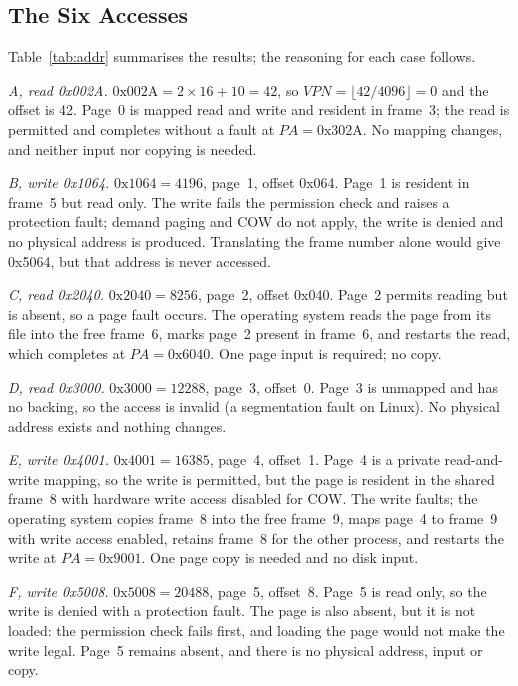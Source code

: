 \documentclass[conference,a4paper]{IEEEtran}
\begin{document}
\subsection{The Six Accesses}
Table~\ref{tab:addr} summarises the results; the reasoning for each case follows.

\emph{A, read 0x002A.} $\mathrm{0x002A} = 2\times16+10 = 42$, so $\mathit{VPN}=\lfloor 42/4096\rfloor = 0$ and the offset is 42. Page~0 is mapped read and write and resident in frame~3; the read is permitted and completes without a fault at $PA = \mathrm{0x302A}$. No mapping changes, and neither input nor copying is needed.

\emph{B, write 0x1064.} $\mathrm{0x1064} = 4196$, page~1, offset 0x064. Page~1 is resident in frame~5 but read only. The write fails the permission check and raises a protection fault; demand paging and COW do not apply, the write is denied and no physical address is produced. Translating the frame number alone would give 0x5064, but that address is never accessed.

\emph{C, read 0x2040.} $\mathrm{0x2040} = 8256$, page~2, offset 0x040. Page~2 permits reading but is absent, so a page fault occurs. The operating system reads the page from its file into the free frame~6, marks page~2 present in frame~6, and restarts the read, which completes at $PA = \mathrm{0x6040}$. One page input is required; no copy.

\emph{D, read 0x3000.} $\mathrm{0x3000} = 12288$, page~3, offset~0. Page~3 is unmapped and has no backing, so the access is invalid (a segmentation fault on Linux). No physical address exists and nothing changes.

\emph{E, write 0x4001.} $\mathrm{0x4001} = 16385$, page~4, offset~1. Page~4 is a private read-and-write mapping, so the write is permitted, but the page is resident in the shared frame~8 with hardware write access disabled for COW. The write faults; the operating system copies frame~8 into the free frame~9, maps page~4 to frame~9 with write access enabled, retains frame~8 for the other process, and restarts the write at $PA = \mathrm{0x9001}$. One page copy is needed and no disk input.

\emph{F, write 0x5008.} $\mathrm{0x5008} = 20488$, page~5, offset~8. Page~5 is read only, so the write is denied with a protection fault. The page is also absent, but it is not loaded: the permission check fails first, and loading the page would not make the write legal. Page~5 remains absent, and there is no physical address, input or copy.
\end{document}
